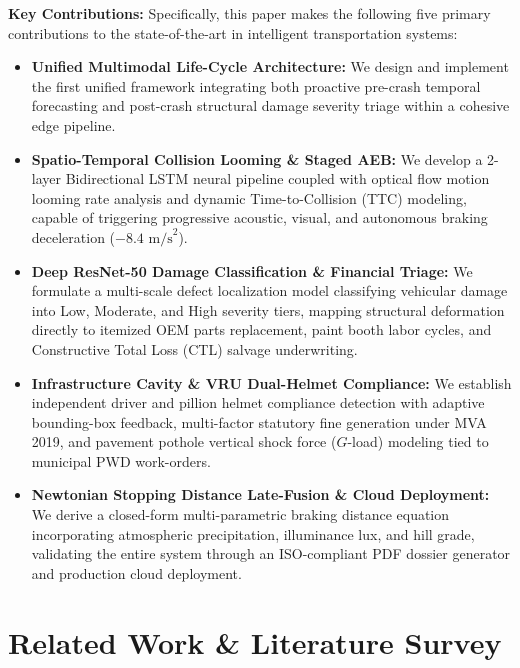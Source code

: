 \documentclass[journal,compsoc]{IEEEtran}
\begin{document}
\textbf{Key Contributions:} Specifically, this paper makes the following five primary contributions to the state-of-the-art in intelligent transportation systems:
\begin{itemize}
    \item \textbf{Unified Multimodal Life-Cycle Architecture:} We design and implement the first unified framework integrating both proactive pre-crash temporal forecasting and post-crash structural damage severity triage within a cohesive edge pipeline.
    \item \textbf{Spatio-Temporal Collision Looming \& Staged AEB:} We develop a 2-layer Bidirectional LSTM neural pipeline coupled with optical flow motion looming rate analysis and dynamic Time-to-Collision (TTC) modeling, capable of triggering progressive acoustic, visual, and autonomous braking deceleration ($-8.4\text{ m/s}^2$).
    \item \textbf{Deep ResNet-50 Damage Classification \& Financial Triage:} We formulate a multi-scale defect localization model classifying vehicular damage into Low, Moderate, and High severity tiers, mapping structural deformation directly to itemized OEM parts replacement, paint booth labor cycles, and Constructive Total Loss (CTL) salvage underwriting.
    \item \textbf{Infrastructure Cavity \& VRU Dual-Helmet Compliance:} We establish independent driver and pillion helmet compliance detection with adaptive bounding-box feedback, multi-factor statutory fine generation under MVA 2019, and pavement pothole vertical shock force ($G$-load) modeling tied to municipal PWD work-orders.
    \item \textbf{Newtonian Stopping Distance Late-Fusion \& Cloud Deployment:} We derive a closed-form multi-parametric braking distance equation incorporating atmospheric precipitation, illuminance lux, and hill grade, validating the entire system through an ISO-compliant PDF dossier generator and production cloud deployment.
\end{itemize}

\section{Related Work \& Literature Survey}
\end{document}

